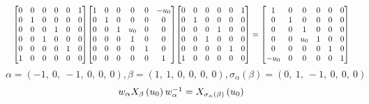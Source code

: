 \documentclass[11pt]{article}
\theoremstyle{definition}
\begin{document}
\[
\scaletoalign{\textwidth}{{\left[\begin{matrix}0 & 0 & 0 & 0 & 0 & 1\\0 & 1 & 0 & 0 & 0 & 0\\0 & 0 & 0 & 1 & 0 & 0\\0 & 0 & 1 & 0 & 0 & 0\\0 & 0 & 0 & 0 & 1 & 0\\1 & 0 & 0 & 0 & 0 & 0\end{matrix}\right]} {\left[\begin{matrix}1 & 0 & 0 & 0 & 0 & - u_{0}\\0 & 1 & 0 & 0 & 0 & 0\\0 & 0 & 1 & u_{0} & 0 & 0\\0 & 0 & 0 & 1 & 0 & 0\\0 & 0 & 0 & 0 & 1 & 0\\0 & 0 & 0 & 0 & 0 & 1\end{matrix}\right]} {\left[\begin{matrix}0 & 0 & 0 & 0 & 0 & 1\\0 & 1 & 0 & 0 & 0 & 0\\0 & 0 & 0 & 1 & 0 & 0\\0 & 0 & 1 & 0 & 0 & 0\\0 & 0 & 0 & 0 & 1 & 0\\1 & 0 & 0 & 0 & 0 & 0\end{matrix}\right]} = {\left[\begin{matrix}1 & 0 & 0 & 0 & 0 & 0\\0 & 1 & 0 & 0 & 0 & 0\\0 & 0 & 1 & 0 & 0 & 0\\0 & 0 & u_{0} & 1 & 0 & 0\\0 & 0 & 0 & 0 & 1 & 0\\- u_{0} & 0 & 0 & 0 & 0 & 1\end{matrix}\right]}}
\]
\[
\alpha = \left( -1, \  0, \  -1, \  0, \  0, \  0\right), \beta = \left( 1, \  1, \  0, \  0, \  0, \  0\right), \sigma_{\alpha}(\beta) = \left( 0, \  1, \  -1, \  0, \  0, \  0\right)
\]
\[
\scaletoalign{\textwidth}{w_{\alpha} X_{\beta}\left(u_{0}\right) w_{\alpha}^{-1} = X_{\sigma_{\alpha}\left(\beta\right)}\left(u_{0}\right)}
\]
\end{document}

